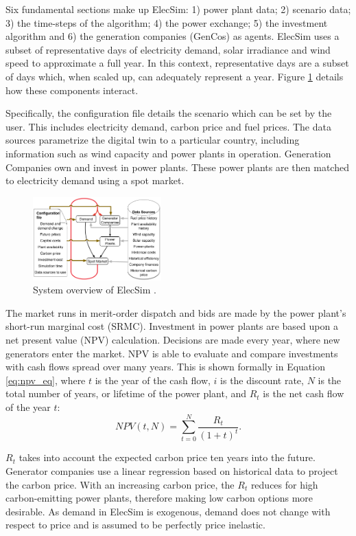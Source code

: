 Six fundamental sections make up ElecSim: 1) power plant data; 2) scenario data; 3) the time-steps of the algorithm; 4) the power exchange; 5) the investment algorithm and 6) the generation companies (GenCos) as agents. ElecSim uses a subset of representative days of electricity demand, solar irradiance and wind speed to approximate a full year. In this context, representative days are a subset of days which, when scaled up, can adequately represent a year. Figure \ref{fig:model_details} details how these components interact. 

Specifically, the configuration file details the scenario which can be set by the user. This includes electricity demand, carbon price and fuel prices. The data sources parametrize the digital twin to a particular country, including information such as wind capacity and power plants in operation. Generation Companies own and invest in power plants. These power plants are then matched to electricity demand using a spot market.

\begin{figure}
	\centering
	\includegraphics[width=0.44\textwidth]{Chapter6/figures/setup/System_overview_large.png}
	\caption{System overview of ElecSim \cite{Kell}.}
	\label{fig:model_details}
\end{figure}

The market runs in merit-order dispatch and bids are made by the power plant's short-run marginal cost (SRMC). Investment in power plants are based upon a net present value (NPV) calculation. Decisions are made every year, where new generators enter the market. NPV is able to evaluate and compare investments with cash flows spread over many years. This is shown formally in Equation \ref{eq:npv_eq}, where $t$ is the year of the cash flow, $i$ is the discount rate, $N$ is the total number of years, or lifetime of the power plant, and $R_t$ is the net cash flow of the year $t$:
\begin{equation} \label{eq:npv_eq}
NPV(t, N) = \sum_{t=0}^{N}\frac{R_t}{(1+t)^t}.
\end{equation}

$R_t$ takes into account the expected carbon price ten years into the future. Generator companies use a linear regression based on historical data to project the carbon price. With an increasing carbon price, the $R_t$ reduces for high carbon-emitting power plants, therefore making low carbon options more desirable. As demand in ElecSim is exogenous, demand does not change with respect to price and is assumed to be perfectly price inelastic. 

